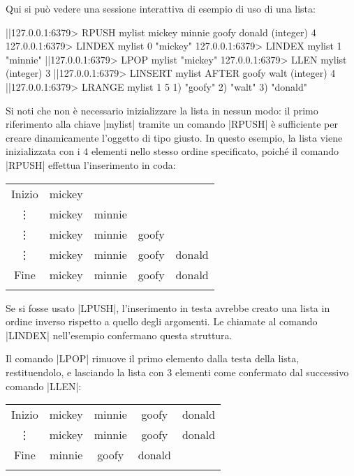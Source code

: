 Qui si può vedere una sessione interattiva di esempio di uso di una lista:

\begin{commentedsource}[style=redis]
|\lnote|127.0.0.1:6379> RPUSH mylist mickey minnie goofy donald
(integer) 4
127.0.0.1:6379> LINDEX mylist 0
"mickey"
127.0.0.1:6379> LINDEX mylist 1
"minnie"
|\lnote|127.0.0.1:6379> LPOP mylist
"mickey"
127.0.0.1:6379> LLEN mylist
(integer) 3
|\lnote|127.0.0.1:6379> LINSERT mylist AFTER goofy walt
(integer) 4
|\lnote|127.0.0.1:6379> LRANGE mylist 1 5
1) "goofy"
2) "walt"
3) "donald"
\end{commentedsource}

Si noti che non è necessario inizializzare la lista in nessun modo: il primo riferimento alla chiave
\cverb|mylist| tramite un comando \cverb|RPUSH|  è sufficiente per creare dinamicamente
l'oggetto di tipo giusto. In questo esempio, la lista viene inizializzata con i $4$ elementi nello
stesso ordine specificato, poiché il comando \cverb|RPUSH| effettua l'inserimento in coda:

\begin{center}
	\begin{tabular}{c|*{4}{c|}}
	  \hhline{~-}
	  \scriptsize Inizio & \cellcolor{blue!25}mickey \\ 
	  \hhline{~--}
	  \vdots             & mickey & \cellcolor{blue!25}minnie \\ 
	  \hhline{~---}
	  \vdots             & mickey & minnie & \cellcolor{blue!25}goofy \\ 
	  \hhline{~----}
	  \vdots             & mickey & minnie & goofy & \cellcolor{blue!25}donald \\ 
	  \hhline{~----}
	  \scriptsize Fine   & mickey & minnie & goofy & donald \\ 
	  \hhline{~----}
	\end{tabular}
\end{center}

Se si fosse usato \cverb|LPUSH|, l'inserimento in testa avrebbe creato una lista in ordine inverso
rispetto a quello degli argomenti. Le chiamate al comando \cverb|LINDEX| nell'esempio confermano
questa struttura.

Il comando \cverb|LPOP|  rimuove il primo elemento dalla testa della lista, restituendolo,
e lasciando la lista con 3 elementi come confermato dal successivo comando \cverb|LLEN|:

\begin{center}
	\begin{tabular}{c|*{4}{c|}}
	  \hhline{~----}
	  \scriptsize Inizio & mickey & minnie & goofy & donald \\ 
	  \hhline{~----}
	  \vdots             & \cellcolor{red!35}mickey & minnie & goofy & donald \\ 
	  \hhline{~----}
	  \scriptsize Fine   & minnie & goofy & donald \\ 
	  \hhline{~---}
	\end{tabular}
\end{center}


